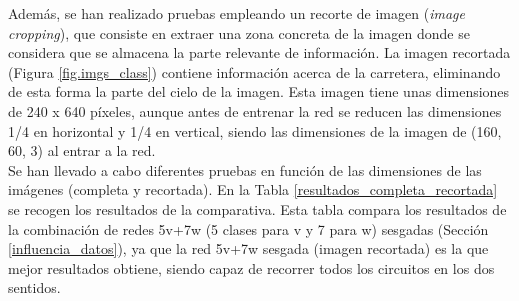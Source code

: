 Además, se han realizado pruebas empleando un recorte de imagen (\textit{image cropping}), que consiste en extraer una zona concreta de la imagen donde se considera que se almacena la parte relevante de información. La imagen recortada (Figura \ref{fig.imgs_class}) contiene información acerca de la carretera, eliminando de esta forma la parte del cielo de la imagen. Esta imagen tiene unas dimensiones de 240 x 640 píxeles, aunque antes de entrenar la red se reducen las dimensiones 1/4 en horizontal y 1/4 en vertical, siendo las dimensiones de la imagen de (160, 60, 3) al entrar a la red.\\


Se han llevado a cabo diferentes pruebas en función de las dimensiones de las imágenes (completa y recortada). En la Tabla \ref{resultados_completa_recortada} se recogen los resultados de la comparativa. Esta tabla compara los resultados de la combinación de redes 5v+7w (5 clases para v y 7 para w) sesgadas (Sección \ref{influencia_datos}), ya que la red 5v+7w sesgada (imagen recortada) es la que mejor resultados obtiene, siendo capaz de recorrer todos los circuitos en los dos sentidos.\\


